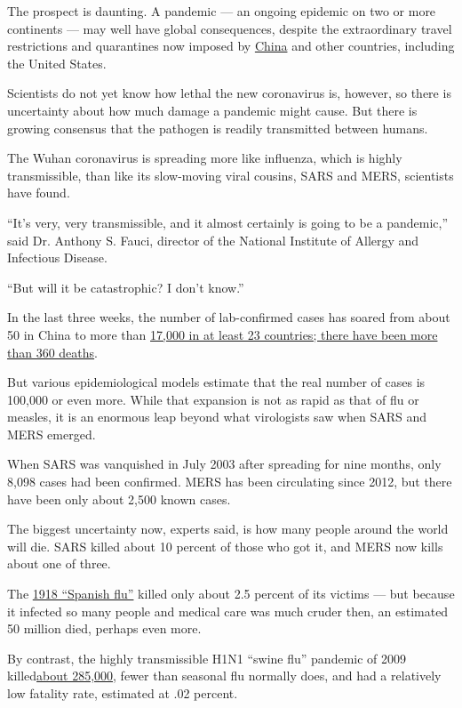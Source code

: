 The prospect is daunting. A pandemic --- an ongoing epidemic on two or
more continents --- may well have global consequences, despite the
extraordinary travel restrictions and quarantines now imposed by
\href{https://www.nytimes.com/2020/02/20/world/asia/japan-coronavirus-clusters.html}{China}
and other countries, including the United States.

Scientists do not yet know how lethal the new coronavirus is, however,
so there is uncertainty about how much damage a pandemic might cause.
But there is growing consensus that the pathogen is readily transmitted
between humans.

The Wuhan coronavirus is spreading more like influenza, which is highly
transmissible, than like its slow-moving viral cousins, SARS and MERS,
scientists have found.

``It's very, very transmissible, and it almost certainly is going to be
a pandemic,'' said Dr. Anthony S. Fauci, director of the National
Institute of Allergy and Infectious Disease.

``But will it be catastrophic? I don't know.''

In the last three weeks, the number of lab-confirmed cases has soared
from about 50 in China to more than
\href{https://www.nytimes.com/2020/02/02/world/asia/china-coronavirus.html}{17,000
in at least 23 countries; there have been more than 360 deaths}.

But various epidemiological models estimate that the real number of
cases is 100,000 or even more. While that expansion is not as rapid as
that of flu or measles, it is an enormous leap beyond what virologists
saw when SARS and MERS emerged.

When SARS was vanquished in July 2003 after spreading for nine months,
only 8,098 cases had been confirmed. MERS has been circulating since
2012, but there have been only about 2,500 known cases.

The biggest uncertainty now, experts said, is how many people around the
world will die. SARS killed about 10 percent of those who got it, and
MERS now kills about one of three.

The \href{https://wwwnc.cdc.gov/eid/article/12/1/05-0979_article}{1918
``Spanish flu''} killed only about 2.5 percent of its victims --- but
because it infected so many people and medical care was much cruder
then, an estimated 50 million died, perhaps even more.

By contrast, the highly transmissible H1N1 ``swine flu'' pandemic of
2009
killed\href{https://www.thelancet.com/journals/laninf/article/PIIS1473-3099(12)70121-4/fulltext}{about
285,000}, fewer than seasonal flu normally does, and had a relatively
low fatality rate, estimated at .02 percent.

